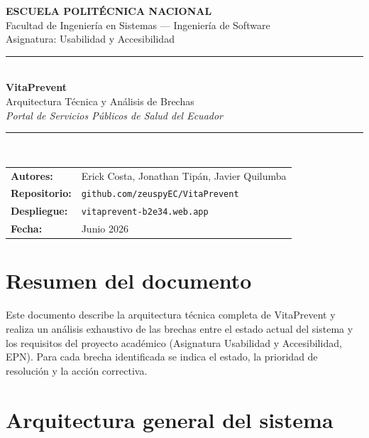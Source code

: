 \documentclass[12pt, a4paper]{article}
\begin{document}
\begin{titlepage}
\centering
\vspace*{2cm}
{\Large\bfseries\color{navydeep} ESCUELA POLITÉCNICA NACIONAL}\\[4pt]
{\normalsize Facultad de Ingeniería en Sistemas --- Ingeniería de Software}\\[4pt]
{\normalsize Asignatura: Usabilidad y Accesibilidad}\\[2cm]
{\color{royalblue}\rule{0.8\linewidth}{1.5pt}}\\[1cm]
{\Huge\bfseries\color{navydeep} VitaPrevent}\\[0.4cm]
{\Large\color{royalblue} Arquitectura Técnica y Análisis de Brechas}\\[0.3cm]
{\large\itshape Portal de Servicios Públicos de Salud del Ecuador}\\[1cm]
{\color{royalblue}\rule{0.8\linewidth}{0.8pt}}\\[1.5cm]
\begin{tabular}{ll}
  \textbf{Autores:} & Erick Costa, Jonathan Tipán, Javier Quilumba \\
  \textbf{Repositorio:} & \texttt{github.com/zeuspyEC/VitaPrevent} \\
  \textbf{Despliegue:} & \texttt{vitaprevent-b2e34.web.app} \\
  \textbf{Fecha:} & Junio 2026 \\
\end{tabular}
\end{titlepage}

\tableofcontents
\newpage

\section{Resumen del documento}

Este documento describe la arquitectura técnica completa de VitaPrevent y realiza un análisis exhaustivo de las brechas entre el estado actual del sistema y los requisitos del proyecto académico (Asignatura Usabilidad y Accesibilidad, EPN). Para cada brecha identificada se indica el estado, la prioridad de resolución y la acción correctiva.

\section{Arquitectura general del sistema}
\end{document}
